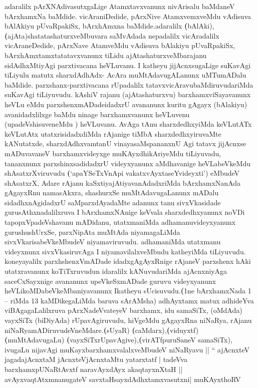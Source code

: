 \begin{artha}
adaralilx pArXNAdivasutxgaLige Atamxtavxvanunx nivArisalu baMdaneV
bArxhamxNa baMdide. vicAraniDedide, pArxNive AtamxvemxveMdu vAdisuva
bAlAkiyu pUvaRpakiSx, bArxhAmxna baMdide.adaralilx
\textbf(bAlAki),\textbf(ajAta)shatatashaturxveMbuvara saMvAdada nepadalilx
vicAradalilx vicAraneDedide, pArxNave AtamveMdu vAdisuva bAlakiyu
pUvaRpakiSx, bArxhAmxtamxtatatavxvanunx tiLidu ajAtashaturxveMbarajanu
sidAdhxMtiyAgi parxtivacana heVLuvanu. I katheyu jijAcnxsugaLige
suKavAgi tiLiyulu matutx sharxdAdhAdx- AcAra muMtAdavugALanunx
uMTumADalu baMdide. parxshanx-parxtivacana rUpadalilx
tatavxvicAravubaMdiruvudariMda suKavAgi tiLiyuvudu. kAshiV rajanu
(ajAtashaturxvu) barxhamxviSayavanunx heVLu eMdu
parxshenxmADadeidadxrU avananunx kuritu gAgayx (bAlakiyu)
avanidadxlilxge baMdu ninage barxhamxvanunx heVLuvenu
(upadeVshisuveneMdu ) heVLuvanu. AvAga tAnu sharxdedhxyiMda keVLutATx
keVLutAtx utatxrisidadxdiMda rAjanige tiMbA sharxdedhxyiruvaMte
kANutatxde, sharxdAdhxvamtanU vinayasaMspananxnU Agi tatavx jijAcnxse
mADuvavaneV barxhamxvideyxge muKAyxdhikAriyeMdu tiLiyuvadu, tananxnunx
parxshinxsadidadxrU videyxyanunx aMdhavanige heVLabeVkeMdu
shAsatxrXviruvudu \textbf(`apaYSeTxVnApi vakatxvAyxtaseYvideyxti')
eMbudeV shAsatxrX, Adare rAjanu kaSxtiyajAtiyavanAdadxriMda
bArxhamxNanAda gAgayxRnu namasAkxra, shashurxSe muMtAdavugaLanunx
mADalu sidadhxnAgidadxrU saMparxdAyadaMte adanunx tanu sivxVkasidade
gurusAthxnadalilxruva I bArxhamxNAnige keVvala sharxdedhxyanunx noVDi
tapopxVpadeVshavanu mADidanu, utatxmaniMda adhamanuvideyxyanunx
gurushushUrxSe, parxNipAta muMtAda niyamagaLiMda
sivxVkarisabeVkeMbudeV niyamaviruvudu. adhamaniMda utatxmanu
videyxnunx sivxVkasiruvAga I niyamavilalxveMbudu katheyiMda
tiLiyuvudu. koneyayalilx parxhshenxVmADade idadxgAgAyxRnige rAjaneV
parxshenx hAki utatxravanunx koTiTxruvudun idaralilx kANuvudariMda
ajAcnxniyAga saceCxSayxnige avananunx upeVkeSxmADade guruvu
videyxyanunx heVLikoMDabeVkeMbaniyavanunx Ikatheyu
sUcisuvudu.\textbf(1ne bArxhamxNada 1 -- riMda 13 kaMDikegaLiMda
baruva sArAMsha) adhAyxtamx matux adhideYva viBAgagaLalilxruva
pArxNadeVvateyeV barxhamx, idu samaSiTx, (oMdAda) vayxSiTx (biDiyAda)
rUpavAgiruvudu, hiVgeMdu gAgayxRna niNaRya, rAjanu
niNaRyamADiruvudeVneMdare.\textbf(sUyaR)
\textbf(caMdarx),\textbf(viduyxtf)\textbf(muMtAdavugaLu)
\textbf(vayxSiTxrUpavAgive),\textbf(virATfpuruSaneV samaSiTx), ivugaLu
nijavAgi muKayxbarxhamxvalalxveMbudeV niNaRyavu || `` ajAcnxteV
jagadajAcnxtaM jAcnxteVjAcnxtaMtu yatarxtatf | tadeVva
barxhamxpUNaRtAvxtf naravAyxdAyx akaqtayxnXtaH ||
avAyxvaqtAtxmnanugateV savxtaHsayxdAdhxtamxvasutxni| muKAyxthoRV

\end{artha}

